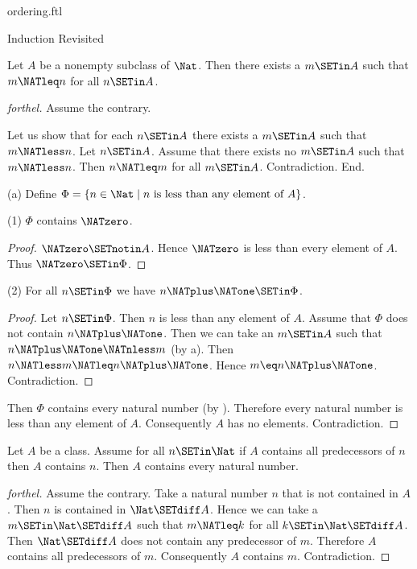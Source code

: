 \documentclass{naproche-library}
\begin{document}
\begin{smodule}[title=The Standard Ordering of the Natural Numbers]{ordering.ftl}
\begin{sfragment}{Induction Revisited}
  \begin{proposition}[forthel,id=ARITHMETIC_04_272317502455808]
    Let $A$ be a nonempty subclass of $\Nat$.
    Then there exists a $m \SETin A$ such that $m \NATleq n$ for all $n \SETin A$.
  \end{proposition}
  \begin{proof}[forthel]
    Assume the contrary.

    Let us show that for each $n \SETin A$ there exists a $m \SETin A$ such that $m \NATless n$.
      Let $n \SETin A$.
      Assume that there exists no $m \SETin A$ such that $m \NATless n$.
      Then $n \NATleq m$ for all $m \SETin A$.
      Contradiction.
    End.

    (a) Define $\Phi = \{ n \in \Nat \mid n\text{ is less than any element of }A \}$.

    (1) $\Phi$ contains $\NATzero$.
    \begin{proof}
      $\NATzero \SETnotin A$.
      Hence $\NATzero$ is less than every element of $A$.
      Thus $\NATzero \SETin \Phi$.
    \end{proof}

    (2) For all $n \SETin \Phi$ we have $n \NATplus \NATone \SETin \Phi$.
    \begin{proof}
      Let $n \SETin \Phi$.
      Then $n$ is less than any element of $A$.
      Assume that $\Phi$ does not contain $n \NATplus \NATone$.
      Then we can take an $m \SETin A$ such that $n \NATplus \NATone \NATnless m$ (by a).
      Then $n \NATless m \NATleq n \NATplus \NATone$.
      Hence $m \eq n \NATplus \NATone$.
      Contradiction.
    \end{proof}

    Then $\Phi$ contains every natural number (by ).
    Therefore every natural number is less than any element of $A$.
    Consequently $A$ has no elements.
    Contradiction.
  \end{proof}

  \begin{theorem}[forthel,id=ARITHMETIC_04_3609801697263616]
    Let $A$ be a class.
    Assume for all $n \SETin \Nat$ if $A$ contains all predecessors of $n$ then $A$ contains $n$.
    Then $A$ contains every natural number.
  \end{theorem}
  \begin{proof}[forthel]
    Assume the contrary.
    Take a natural number $n$ that is not contained in $A$.
    Then $n$ is contained in $\Nat \SETdiff A$.
    Hence we can take a $m \SETin \Nat \SETdiff A$ such that $m \NATleq k$ for all $k \SETin \Nat \SETdiff A$.
    Then $\Nat \SETdiff A$ does not contain any predecessor of $m$.
    Therefore $A$ contains all predecessors of $m$.
    Consequently $A$ contains $m$.
    Contradiction.
  \end{proof}


\end{sfragment}
\end{smodule}
\end{document}
